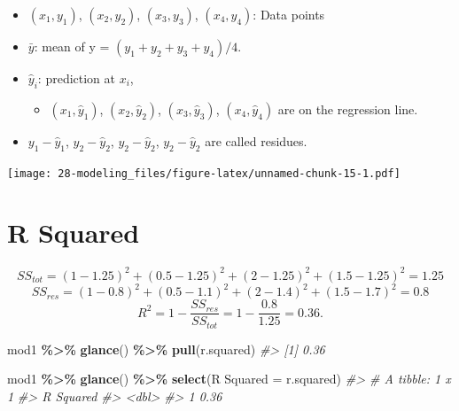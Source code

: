 \documentclass[
  xelatex, ja=standard]{bxjsbook}
\newenvironment{Shaded}{\begin{snugshade}}{\end{snugshade}}
\newcommand{\AttributeTok}[1]{\textcolor[rgb]{0.13,0.29,0.53}{#1}}
\newcommand{\CommentTok}[1]{\textcolor[rgb]{0.56,0.35,0.01}{\textit{#1}}}
\newcommand{\FunctionTok}[1]{\textcolor[rgb]{0.13,0.29,0.53}{\textbf{#1}}}
\newcommand{\NormalTok}[1]{#1}
\newcommand{\OtherTok}[1]{\textcolor[rgb]{0.56,0.35,0.01}{#1}}
\newcommand{\SpecialCharTok}[1]{\textcolor[rgb]{0.81,0.36,0.00}{\textbf{#1}}}
\newcommand{\StringTok}[1]{\textcolor[rgb]{0.31,0.60,0.02}{#1}}
\providecommand{\tightlist}{%
  \setlength{\itemsep}{0pt}\setlength{\parskip}{0pt}}
\theoremstyle{definition}
\theoremstyle{definition}
\theoremstyle{definition}
\theoremstyle{definition}
\theoremstyle{remark}
\begin{document}
\begin{itemize}
\tightlist
\item
  \((x_1, y_1)\), \((x_2,y_2)\), \((x_3, y_3)\), \((x_4, y_4)\): Data points
\item
  \(\bar{y}\): mean of y = \((y_1 + y_2 + y_3 + y_4)/4\).
\item
  \(\hat{y}_i\): prediction at \(x_i\),

  \begin{itemize}
  \tightlist
  \item
    \((x_1, \hat{y}_1)\), \((x_2, \hat{y}_2)\), \((x_3, \hat{y}_3)\), \((x_4, \hat{y}_4)\) are on the regression line.
  \end{itemize}
\item
  \(y_1-\hat{y}_1\), \(y_2-\hat{y}_2\), \(y_2-\hat{y}_2\), \(y_2-\hat{y}_2\) are called residues.
\end{itemize}

\texttt{[image: 28-modeling\_files/figure-latex/unnamed-chunk-15-1.pdf]}

\hypertarget{r-squared}{%
\section{R Squared}\label{r-squared}}

\[SS_{tot} = (1-1.25)^2 + (0.5-1.25)^2 + (2-1.25)^2 + (1.5-1.25)^2 = 1.25\] \[SS_{res} = (1-0.8)^2 + (0.5-1.1)^2 + (2-1.4)^2 + (1.5-1.7)^2 = 0.8\] \[R^2 = 1 - \frac{SS_{res}}{SS_{tot}} = 1- \frac{0.8}{1.25} = 0.36.\]

\begin{Shaded}
\end{Shaded}

\begin{Shaded}
\begin{Highlighting}[]
\NormalTok{mod1 }\SpecialCharTok{\%\textgreater{}\%} \FunctionTok{glance}\NormalTok{() }\SpecialCharTok{\%\textgreater{}\%} \FunctionTok{pull}\NormalTok{(r.squared)}
\CommentTok{\#\textgreater{} [1] 0.36}
\end{Highlighting}
\end{Shaded}

\begin{Shaded}
\begin{Highlighting}[]
\NormalTok{mod1 }\SpecialCharTok{\%\textgreater{}\%} \FunctionTok{glance}\NormalTok{() }\SpecialCharTok{\%\textgreater{}\%} \FunctionTok{select}\NormalTok{(}\StringTok{\textasciigrave{}}\AttributeTok{R Squared}\StringTok{\textasciigrave{}} \OtherTok{=}\NormalTok{ r.squared)}
\CommentTok{\#\textgreater{} \# A tibble: 1 x 1}
\CommentTok{\#\textgreater{}   \textasciigrave{}R Squared\textasciigrave{}}
\CommentTok{\#\textgreater{}         \textless{}dbl\textgreater{}}
\CommentTok{\#\textgreater{} 1        0.36}
\end{Highlighting}
\end{Shaded}
\end{document}
